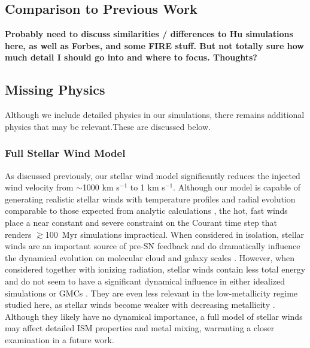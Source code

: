 \documentclass[twocolumn]{aastex61}
\begin{document}
\subsection{Comparison to Previous Work}
\textbf{Probably need to discuss similarities / differences to Hu simulations here, as well as Forbes, and some FIRE stuff. But not totally sure how much detail I should go into and where to focus. Thoughts?}

\subsection{Missing Physics}
Although we include detailed physics in our simulations, there remains additional physics that may be relevant.These are discussed below.

\subsubsection{Full Stellar Wind Model}
\label{sec:stellar winds discussion}
As discussed previously, our stellar wind model significantly reduces the injected wind velocity from $\sim$1000 km s$^{-1}$ to 1 km s$^{-1}$. Although our model is capable of generating realistic stellar winds with temperature profiles and radial evolution comparable to those expected from analytic calculations \citep{Weaver1977}, the hot, fast winds place a near constant and severe constraint on the Courant time step that renders $\gtrsim$100~Myr simulations impractical. When considered in isolation, stellar winds are an important source of pre-SN feedback and do dramatically influence the dynamical evolution on molecular cloud and galaxy scales \citep{Dale2008,Peters2017,Gatto2017}. However, when considered together with ionizing radiation, stellar winds contain less total energy \citep{Agertz2013} and do not seem to have a significant dynamical influence in either idealized simulations \citep{Geen2015} or GMCs \citep{Dale2014}. They are even less relevant in the low-metallicity regime studied here, as stellar winds become weaker with decreasing metallicity \citep{Puls2000, Vink2005}. Although they likely have no dynamical importance, a full model of stellar winds may affect detailed ISM properties and metal mixing, warranting a closer examination in a future work.

\end{document}
